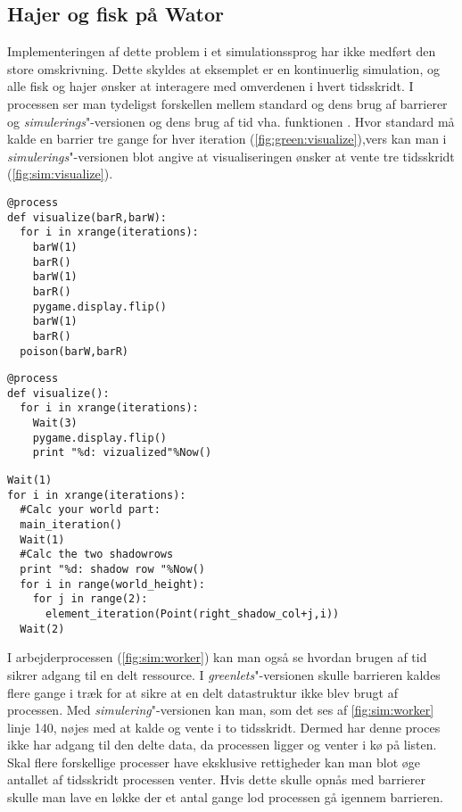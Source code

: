 \subsection{Hajer og fisk på Wator}
Implementeringen af dette problem  i et simulationssprog har ikke medført den store omskrivning. Dette skyldes at eksemplet er en kontinuerlig simulation, og alle fisk og hajer ønsker at interagere med omverdenen i hvert tidsskridt. I processen  ser man tydeligst forskellen mellem standard \pycsp og dens brug af barrierer og \emph{simulerings}"-versionen og dens brug af tid vha. funktionen . Hvor standard \pycsp må kalde en barrier tre gange for hver iteration (\cref{fig:green:visualize}),vers kan man i \emph{simulerings}"-versionen blot angive at visualiseringen ønsker at vente tre tidsskridt (\cref{fig:sim:visualize}). 

\begin{lstlisting}[firstnumber=157 ,float=hbtp, label=fig:green:visualize, caption=\code{Greenlets}"-versionen af visualize]
@process
def visualize(barR,barW):
  for i in xrange(iterations):
    barW(1)
    barR()
    barW(1)
    barR()
    pygame.display.flip()
    barW(1)
    barR()
  poison(barW,barR)     
\end{lstlisting}

\begin{lstlisting}[firstnumber=144 ,float=hbtp, label=fig:sim:visualize, caption=\code{simulerings}"-versionen af visualize]
@process
def visualize():
  for i in xrange(iterations):
    Wait(3)  
    pygame.display.flip()
    print "%d: vizualized"%Now()
\end{lstlisting}

\begin{lstlisting}[firstnumber=130 ,float=hbtp, label=fig:sim:worker, caption=Uddrag af arbejderprocessen i simulering]
Wait(1)
for i in xrange(iterations):
  #Calc your world part:
  main_iteration()
  Wait(1)
  #Calc the two shadowrows
  print "%d: shadow row "%Now()
  for i in range(world_height):
    for j in range(2):
      element_iteration(Point(right_shadow_col+j,i))
  Wait(2)
\end{lstlisting}

I arbejderprocessen (\cref{fig:sim:worker}) kan man også se hvordan brugen af tid  sikrer adgang til en delt ressource. I  \emph{greenlets}"-versionen skulle barrieren  kaldes flere gange i træk for at sikre at en delt datastruktur ikke blev brugt af processen. Med \emph{simulering}"-versionen kan man, som det ses af \cref{fig:sim:worker} linje 140, nøjes med at kalde  og vente i to tidsskridt. Dermed har denne proces ikke har adgang til den delte data, da processen  ligger og venter i kø på  listen. Skal flere forskellige processer have eksklusive rettigheder kan man blot øge antallet af tidsskridt processen venter. Hvis dette skulle opnås med barrierer skulle man lave en løkke der et antal gange lod processen gå igennem barrieren.

